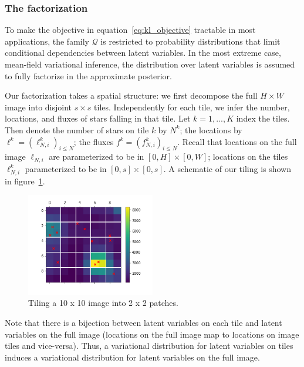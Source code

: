 \subsubsection{The factorization}
To make the objective in equation~\eqref{eq:kl_objective} tractable in most 
applications, the family $\mathcal{Q}$ is restricted to probability distributions 
that limit conditional dependencies between latent variables. In the most extreme case, mean-field variational inference, 
the distribution over latent variables is assumed to fully factorize in the approximate posterior. 

Our factorization takes a spatial structure: we first decompose the full 
$H \times W$ image into disjoint $s \times s$ tiles. 
Independently for each tile,
we infer the number, locations, and fluxes of stars falling in that tile.
Let $k = 1, ..., K$ index the tiles. Then
denote the number of stars on tile $k$ by $N^k$;
the locations by $\ell^k = (\ell_{N, i}^k)_{i \leq N}$; 
the fluxes $f^k = (f_{N, i}^k)_{i \leq N}$. Recall that locations on the 
full image $\ell_{N, i}$ are parameterized to be in $[0, H] \times [0, W]$; 
locations on the tiles $\ell^k_{N, i}$ parameterized to be in
$[0, s] \times [0, s]$. A schematic 
of our tiling is shown in figure~\ref{fig:ex_tiles}. 

\begin{figure}[h]
    \centering
    \includegraphics[width = 0.5\textwidth]{figures/example_tiled.png}
    \vspace{-1cm}
    \caption{Tiling a 10 x 10 image into 2 x 2 patches. }
    \label{fig:ex_tiles}
\end{figure}

Note that there is a bijection between latent variables on each tile and latent variables on the full image (locations on the full image map to locations on image tiles and vice-versa). Thus, a variational distribution for latent variables on tiles induces a variational distribution for latent variables on the full image. 


